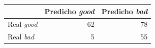 \begin{tabular}{lrr}
\toprule
 & Predicho \emph{good} & Predicho \emph{bad} \\
\midrule
Real \emph{good} & \num{62} & \num{78} \\
Real \emph{bad} & \num{5} & \num{55} \\
\bottomrule
\end{tabular}
